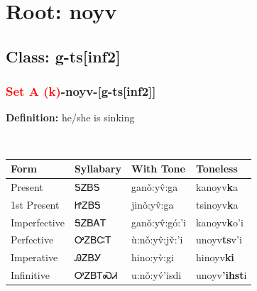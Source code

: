 \needspace{4in}
\section*{Root: noyv}
\nopagebreak
{}
\needspace{3in}
\subsection*{Class: g-ts[inf2]}
\nopagebreak
\needspace{2in}
\subsubsection*{\textcolor{Red}{Set A (k)}{-}\textbf{noyv}{-}[g-ts[inf2]]}
\nopagebreak
\textbf{Definition: } he/she is sinking
\\[0.5em]
\begin{tabularx}{\textwidth}{l X X X}%
\toprule%
\textbf{Form}&\textbf{Syllabary}&\textbf{With Tone}&\textbf{Toneless}\\%
\midrule%
Present&ᎦᏃᏴᎦ&ganǒ:yv̂:ga&kanoyv\textbf{k}a\\%
1st Present&ᏥᏃᏴᎦ&jinǒ:yv̂:ga&tsinoyv\textbf{k}a\\%
Imperfective&ᎦᏃᏴᎪᎢ&ganǒ:yv̂:gó:’i&kanoyv\textbf{k}o'i\\%
Perfective&ᎤᏃᏴᏨᎢ&ù:nǒ:yv̂:jv̌:’i&unoyv\textbf{ts}v'i\\%
Imperative&ᎯᏃᏴᎩ&hino:yv̀:gi&hinoyv\textbf{ki}\\%
Infinitive&ᎤᏃᏴᎢᏍᏗ&u:nǒ:yv́’isdi&unoyv\textbf{'ihst}i\\%
\bottomrule%
\end{tabularx}
\\[1em]